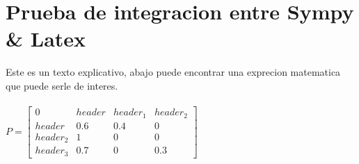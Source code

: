 \documentclass[titlepage]{article} %
\begin{document}

\clearpage
\section{Prueba de integracion entre Sympy \& Latex}
Este es un texto explicativo, abajo puede encontrar una
exprecion matematica que puede serle de interes. \\\\ 
$ P = \left[\begin{matrix}0 & header & header_{1} & header_{2}\\header & 0.6 & 0.4 & 0\\header_{2} & 1 & 0 & 0\\header_{3} & 0.7 & 0 & 0.3\end{matrix}\right] $
\end{document}

